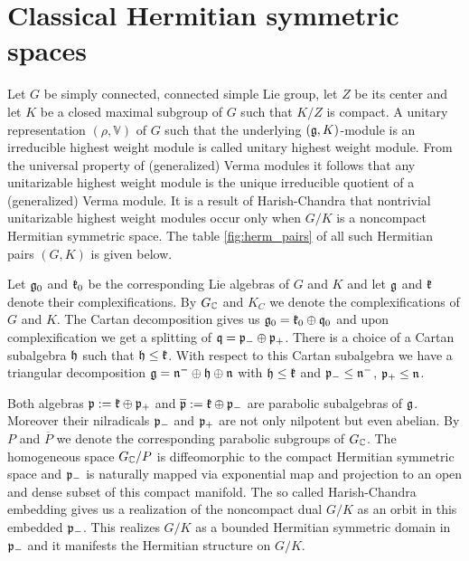 \section{Classical Hermitian symmetric spaces}


Let $G$ be simply connected, connected simple Lie group, let $Z$ be its center and let $K$ be a closed  maximal subgroup of $G$ such that $K/Z$ is compact. A unitary representation $(\rho,\mathbb{V})$  of $G$ such that the underlying $(\mathfrak{g},K)$-module is an irreducible highest weight module is called unitary highest weight module. From the universal property of (generalized) Verma modules it follows that any unitarizable highest weight module is the unique irreducible quotient of a (generalized) Verma module. It is a result of Harish-Chandra that nontrivial unitarizable highest weight modules occur only when $G/K$ is a noncompact Hermitian symmetric space. The table \ref{fig:herm_pairs} of all such Hermitian pairs $(G,K)$ is given below.

Let $\mathfrak{g}_0$ and $\mathfrak{k}_0$ be the corresponding Lie algebras of $G$ and $K$ and let $\mathfrak{g}$ and $\mathfrak{k}$ denote their complexifications. By $G_{\mathbb{C}}$ and $K_C$ we denote the complexifications of $G$ and $K$. The Cartan decomposition gives us $\mathfrak{g}_0 = \mathfrak{k}_0 \oplus \mathfrak{q}_0$ and upon complexification we get a splitting of  $\mathfrak{q} = \mathfrak{p}_-\oplus\mathfrak{p}_+$. %
There is a choice of a Cartan subalgebra $\mathfrak{h}$ such that $\mathfrak{h} \leq \mathfrak{k}$. With respect to this Cartan subalgebra we have a triangular decomposition $\mathfrak{g}=\mathfrak{n}^-\oplus\mathfrak{h}\oplus\mathfrak{n}$ with $\mathfrak{h} \leq \mathfrak{k}$ and $\mathfrak{p}_-\leq \mathfrak{n}^-$, $\mathfrak{p}_+ \leq \mathfrak{n}$.

Both algebras $\mathfrak{p} := \mathfrak{k}\oplus \mathfrak{p}_+$ and $\overline{\mathfrak{p}} := \mathfrak{k}\oplus\mathfrak{p}_-$ are parabolic subalgebras of $\mathfrak{g}$. Moreover their nilradicals $\mathfrak{p}_-$ and $\mathfrak{p}_+$ are not only nilpotent but even abelian. By $P$ and $\overline{P}$ we denote the corresponding parabolic subgroups of $G_{\mathbb{C}}$. The homogeneous space $G_{\mathbb{C}}/P$ is diffeomorphic to the compact Hermitian symmetric space and $\mathfrak{p}_-$ is naturally mapped via exponential map and projection to an open and dense subset of this compact manifold. The so called Harish-Chandra embedding gives us a realization of the noncompact dual $G/K$ as an orbit in this embedded $\mathfrak{p}_-$. This realizes $G/K$ as a bounded Hermitian symmetric domain in $\mathfrak{p}_-$ and it manifests the Hermitian structure on $G/K$.

